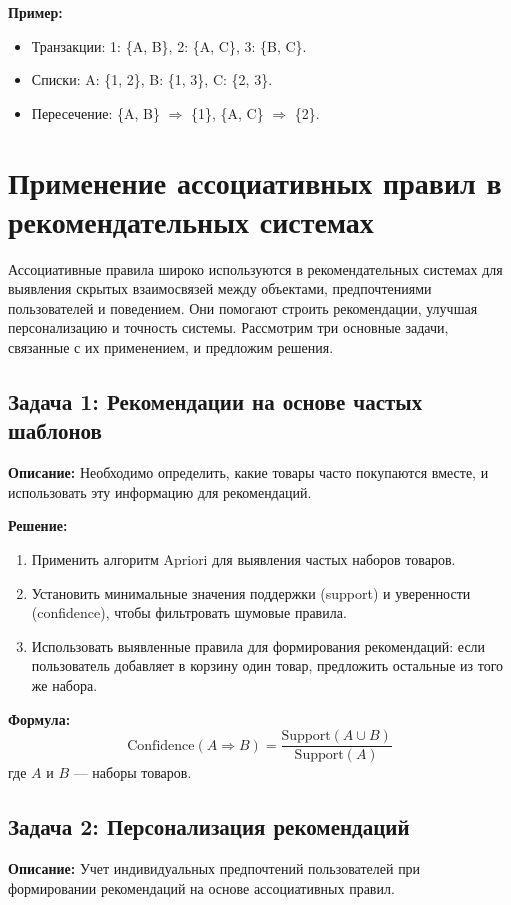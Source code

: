 \documentclass[a4paper,12pt]{article}
\begin{document}
\textbf{Пример:}

\begin{itemize}
    \item Транзакции: 1: \{A, B\}, 2: \{A, C\}, 3: \{B, C\}.
    \item Списки: A: \{1, 2\}, B: \{1, 3\}, C: \{2, 3\}.
    \item Пересечение: \{A, B\} $\Rightarrow$ \{1\}, \{A, C\} $\Rightarrow$ \{2\}.
\end{itemize}

\section{Применение ассоциативных правил в рекомендательных системах}

Ассоциативные правила широко используются в рекомендательных системах для выявления скрытых взаимосвязей между объектами, предпочтениями пользователей и поведением. Они помогают строить рекомендации, улучшая персонализацию и точность системы. Рассмотрим три основные задачи, связанные с их применением, и предложим решения.

\subsection{Задача 1: Рекомендации на основе частых шаблонов}
\textbf{Описание:} 
Необходимо определить, какие товары часто покупаются вместе, и использовать эту информацию для рекомендаций.

\textbf{Решение:}
\begin{enumerate}
    \item Применить алгоритм Apriori для выявления частых наборов товаров.
    \item Установить минимальные значения поддержки (support) и уверенности (confidence), чтобы фильтровать шумовые правила.
    \item Использовать выявленные правила для формирования рекомендаций: если пользователь добавляет в корзину один товар, предложить остальные из того же набора.
\end{enumerate}

\textbf{Формула:}
\begin{equation}
    \text{Confidence}(A \Rightarrow B) = \frac{\text{Support}(A \cup B)}{\text{Support}(A)}
\end{equation}
где $A$ и $B$ — наборы товаров.

\subsection{Задача 2: Персонализация рекомендаций}
\textbf{Описание:}
Учет индивидуальных предпочтений пользователей при формировании рекомендаций на основе ассоциативных правил.
\end{document}

